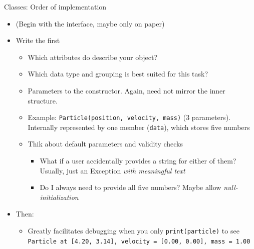 \begin{frame}{Classes: Order of implementation}
%
\begin{itemize}
\item (Begin with the interface, maybe only on paper)
\item Write the  first
	\begin{itemize}
	\item Which attributes do describe your object?
	\item Which data type and grouping is best suited for this task?
	\item Parameters to the constructor. Again, need not mirror the inner structure.
	\item Example: \texttt{Particle(position, velocity, mass)} (3 parameters). Internally represented by one member (\texttt{data}), which stores five numbers
	\item Thik about default parameters and validity checks
		\begin{itemize}
		\item What if a user accidentally provides a string for either of them?\\
			Usually, just  an Exception \emph{with meaningful text}
		\item Do I always need to provide all five numbers? Maybe allow \emph{null-initialization}
		\end{itemize}
	\end{itemize}
\item Then: 
	\begin{itemize}
	\item Greatly facilitates debugging when you only \texttt{print(particle)} to see \texttt{Particle at [4.20, 3.14], velocity = [0.00, 0.00], mass = 1.00}
	\end{itemize}
\end{itemize}
%
\end{frame}



